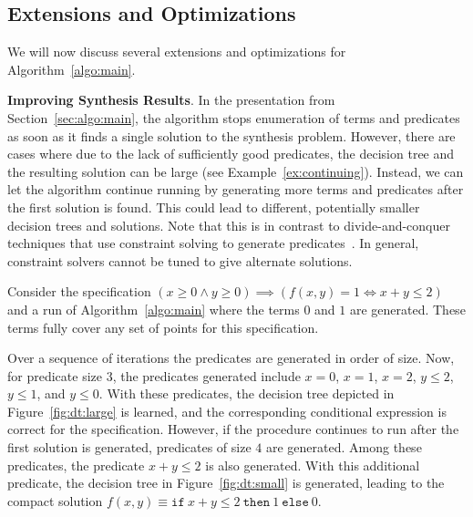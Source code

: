 \documentclass{llncs}
\newcommand\SynthFun{f}
\renewcommand{\paragraph}[1]{\par\noindent\textbf{#1}.}
\begin{document}
\subsection{Extensions and Optimizations}
\label{sec:optimizations}

We will now discuss several extensions and optimizations for
Algorithm~\ref{algo:main}.


\paragraph{Improving Synthesis Results}
In the presentation from Section~\ref{sec:algo:main}, the algorithm
stops enumeration of terms and predicates as soon as it finds a single
solution to the synthesis problem.
However, there are cases where due to the lack of sufficiently good
predicates, the decision tree and the resulting solution can be large
(see Example~\ref{ex:continuing}).
Instead, we can let the algorithm continue running by generating more
terms and predicates after the first solution is found.
This could lead to different, potentially smaller decision trees and
solutions.
Note that this is in contrast to divide-and-conquer techniques that use
constraint solving to generate predicates~\cite{alur-15,madhusudan-16-pw}.
In general, constraint solvers cannot be tuned to give alternate
solutions.

\begin{example}
  \label{ex:continuing}
  Consider the specification $(x \geq 0 \wedge y \geq 0) \implies (\SynthFun(x, y) = 1
  \Leftrightarrow x + y \leq 2)$ and a run of Algorithm~\ref{algo:main}
  where the terms $0$ and $1$ are generated.
  These terms fully cover any set of points for this specification.

  Over a sequence of iterations the predicates are generated in order of
  size.
  Now, for predicate size $3$, the predicates generated include $x = 0$,
  $x = 1$, $x = 2$, $y \leq 2$, $y \leq 1$, and $y \leq 0$.
  With these predicates, the decision tree depicted in
  Figure~\ref{fig:dt:large} is learned, and the corresponding
  conditional expression is correct for the specification.
  However, if the procedure continues to run after the first solution is
  generated, predicates of size $4$ are generated.
  Among these predicates, the predicate $x + y \leq 2$ is also
  generated.
  With this additional predicate, the decision tree in
  Figure~\ref{fig:dt:small} is generated, leading to the compact
  solution $\SynthFun(x, y) \equiv \mathtt{if}~x + y \leq
  2~\mathtt{then}~1~\mathtt{else}~0$.
\end{example}
\end{document}
